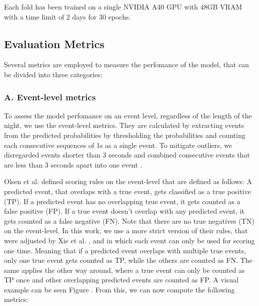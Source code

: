 Each fold has been trained on a single NVIDIA A40 GPU with 48GB VRAM with a time limit of 2 days for 30 epochs.

\subsection*{Evaluation Metrics}

Several metrics are employed to measure the perfomance of the model, that can be divided into three categories:

\subsubsection*{A. Event-level metrics}

To assess the model perfomance on an event level, regardless of the length of the night, we use the event-level metrics. They are calculated by extracting events from the predicted probabilities by thresholding the probabilities and counting each consecutive sequences of 1s as a single event. To mitigate outliers, we disregarded events shorter than 3 seconds and combined consecutive events that are less than 3 seconds apart into one event .

Olsen et al. \cite{olsen2020robust} defined scoring rules on the event-level that are defined as follows: A predicted event, that overlaps with a true event, gets classified as a true positive (TP). If a predicted event has no overlapping true event, it gets counted as a false positive (FP). If a true event doesn't overlap with any predicted event, it gets counted as a false negative (FN). Note that there are no true negatives (TN) on the event-level. In this work, we use a more strict version of their rules, that were adjusted by Xie et al. \cite{xie2023use}, and in which each event can only be used for scoring one time. Meaning that if a predicted event overlaps with multiple true events, only one true event gets counted as TP, while the others are counted as FN. The same applies the other way around, where a true event can only be counted as TP once and other overlapping predicted events are counted as FP. A visual example can be seen Figure . From this, we can now compute the following metrics:


